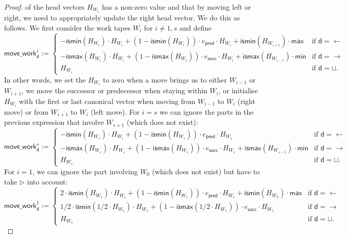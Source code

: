 \begin{proof}
of the head vectors $H_{W_i}$ has a non-zero value and that by moving left or right, we need to 
appropriately update the right head vector. We do this as follows. We first consider the work tapes 
$W_i$ for $i\neq 1,s$ and define
$$
\mathsf{move\_work}^i_{\mathsf{d}}:=
\begin{cases}
	-\mathsf{ismin}(H_{W_i})\cdot H_{W_i} + (1-\mathsf{ismin}(H_{W_i}))\cdot e_{\mathsf{pred}}\cdot H_{W_i} + \mathsf{ismin}(H_{W_{i+1}})\cdot\mathsf{max} & \text{if $\mathsf{d}=\leftarrow$}\\
		-\mathsf{ismax}(H_{W_i})\cdot H_{W_i} + (1-\mathsf{ismax}(H_{W_i}))\cdot e_{\mathsf{succ}}\cdot H_{W_i} + \mathsf{ismax}(H_{W_{i-1}})\cdot\mathsf{min} & \text{if $\mathsf{d}=\rightarrow$}\\
	H_{W_i} & \text{if $\mathsf{d}=\sqcup$}. 	
\end{cases}
$$
In other words, we set the $H_{W_i}$ to zero when a move brings us to either $W_{i-1}$ or $W_{i+1}$, we
move the successor or predecessor when staying within $W_i$, or initialise $H_{W_i}$ with the first or 
last canonical vector when moving from $W_{i-1}$ to $W_i$ (right move) or from $W_{i+1}$ to $W_i$ (left move).
For $i=s$ we can ignore the parts in the previous expression that involve $W_{s+1}$ (which does not exist):
$$
\mathsf{move\_work}^s_{\mathsf{d}}:=
\begin{cases}
	-\mathsf{ismin}(H_{W_s})\cdot H_{W_i} + (1-\mathsf{ismin}(H_{W_s}))\cdot e_{\mathsf{pred}}\cdot H_{W_s}  & \text{if $\mathsf{d}=\leftarrow$}\\
		-\mathsf{ismax}(H_{W_s}) \cdot H_{W_s} + (1-\mathsf{ismax}(H_{W_s}))\cdot e_{\mathsf{succ}}\cdot H_{W_s} + \mathsf{ismax}(H_{W_{s-1}})\cdot \mathsf{min} & \text{if $\mathsf{d}=\rightarrow$}\\
	H_{W_s} & \text{if $\mathsf{d}=\sqcup$}. 	
\end{cases}
$$
For $i=1$, we can ignore the part involving $W_{0}$ (which does not exist) but have to take $\rhd$ 
into account:
$$
\mathsf{move\_work}^1_{\mathsf{d}}:=
\begin{cases}
	2\cdot \mathsf{ismin}(H_{W_1})\cdot H_{W_i} + (1-\mathsf{ismin}(H_{W_1}))\cdot e_{\mathsf{pred}}\cdot H_{W_1} + \mathsf{ismin}(H_{W_{2}})\cdot\mathsf{max} & \text{if $\mathsf{d}=\leftarrow$}\\
		1/2\cdot\mathsf{ismin}(1/2\cdot H_{W_1})\cdot H_{W_1} + (1-\mathsf{ismax}(1/2\cdot H_{W_1}))\cdot e_{\mathsf{succ}}\cdot H_{W_1}  & \text{if $\mathsf{d}=\rightarrow$}\\
	H_{W_1} & \text{if $\mathsf{d}=\sqcup$}. 	

\end{cases}$$
\end{proof}

